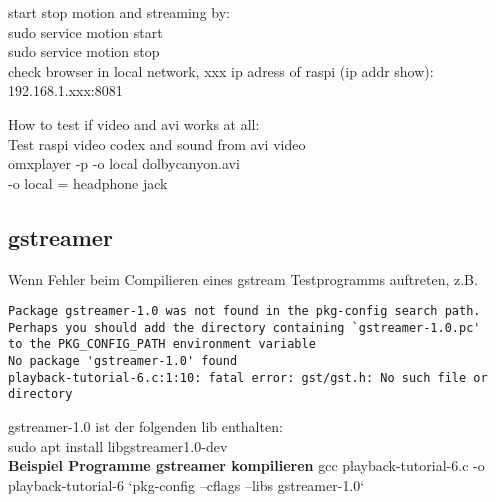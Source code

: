 start stop motion and streaming by:\\
sudo service motion start\\
sudo service motion stop\\

check browser in local network, xxx ip adress of raspi (ip addr show):\\
192.168.1.xxx:8081

How to test if video and avi works at all:\\
Test raspi video codex and sound from avi video\\
omxplayer -p -o local dolbycanyon.avi\\
-o local = headphone jack

\subsection{gstreamer}

Wenn Fehler beim Compilieren eines gstream Testprogramms auftreten, z.B.
\begin{verbatim}
Package gstreamer-1.0 was not found in the pkg-config search path.
Perhaps you should add the directory containing `gstreamer-1.0.pc'
to the PKG_CONFIG_PATH environment variable
No package 'gstreamer-1.0' found
playback-tutorial-6.c:1:10: fatal error: gst/gst.h: No such file or directory
\end{verbatim}

gstreamer-1.0 ist der folgenden lib enthalten:\\
sudo apt install libgstreamer1.0-dev\\

\textbf{Beispiel Programme gstreamer kompilieren}
gcc playback-tutorial-6.c -o playback-tutorial-6 `pkg-config --cflags --libs gstreamer-1.0`


